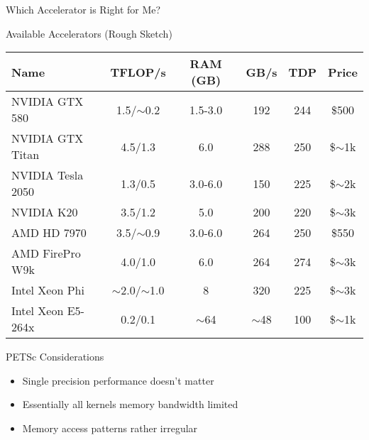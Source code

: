 \begin{frame}{Which Accelerator is Right for Me?}
 
  \begin{block}{Available Accelerators (Rough Sketch)}

   \begin{center}
    \begin{tabular}{|l|c|c|c|c|c|}
     \hline
      Name             & TFLOP/s & RAM (GB) & GB/s & TDP & Price \\
     \hline
     NVIDIA GTX 580    & 1.5/$\sim$0.2 & 1.5-3.0 & 192 & 244 & \$500   \\
     NVIDIA GTX Titan  & 4.5/1.3  & 6.0     & 288 & 250 & \$$\sim$1k \\
     NVIDIA Tesla 2050 & 1.3/0.5  & 3.0-6.0 & 150 & 225 & \$$\sim$2k \\
     NVIDIA K20        & 3.5/1.2  & 5.0     & 200 & 220 & \$$\sim$3k \\
     \hline
     AMD HD 7970       & 3.5/$\sim$0.9 & 3.0-6.0 & 264 & 250 & \$550 \\
     AMD FirePro W9k   & 4.0/1.0  & 6.0     & 264 & 274 & \$$\sim$3k \\
     \hline
     Intel Xeon Phi    & $\sim$2.0/$\sim$1.0 & 8 & 320 & 225 & \$$\sim$3k \\
     \hline
     \hline
     Intel Xeon E5-264x  & 0.2/0.1  & $\sim$64 & $\sim$48 & 100 & \$$\sim$1k \\
     \hline
   \end{tabular}
   \end{center}
  \end{block}

  \begin{block}{PETSc Considerations}
   \begin{itemize}
    \item Single precision performance doesn't matter
    \item Essentially all kernels memory bandwidth limited
    \item Memory access patterns rather irregular
   \end{itemize}
  \end{block}

\end{frame}


